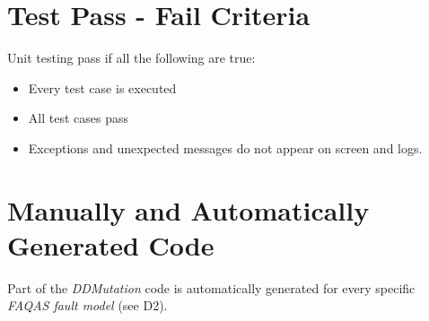 \section{Test Pass - Fail Criteria}

Unit testing pass if all the following are true:
\begin{itemize}
	\item Every test case is executed
	\item All test cases pass
	\item Exceptions and unexpected messages do not appear on screen and logs.
\end{itemize}



\section{Manually and Automatically Generated Code}

Part of the \emph{DDMutation} code is automatically generated for every specific \emph{FAQAS fault model} (see D2).
